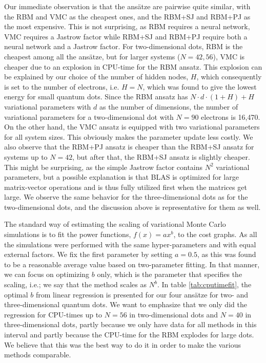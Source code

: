 Our immediate observation is that the ansätze are pairwise quite similar, with the RBM and VMC as the cheapest ones, and the RBM+SJ and RBM+PJ as the most expensive. This is not surprising, as RBM requires a neural network, VMC requires a Jastrow factor while RBM+SJ and RBM+PJ require both a neural network and a Jastrow factor. For two-dimensional dots, RBM is the cheapest among all the ansätze, but for larger systems ($N=42,56$), VMC is cheaper due to an explosion in CPU-time for the RBM ansatz. This explosion can be explained by our choice of the number of hidden nodes, $H$, which consequently is set to the number of electrons, i.e. $H=N$, which was found to give the lowest energy for small quantum dots\supercite{flugsrud_vilde_moe_solving_nodate}. Since the RBM ansatz has $N\cdot d\cdot (1+H)+H$ variational parameters with $d$ as the number of dimensions, the number of variational parameters for a two-dimensional dot with $N=90$ electrons is 16,470. On the other hand, the VMC ansatz is equipped with two variational parameters for all system sizes. This obviously makes the parameter update less costly. We also observe that the RBM+PJ ansatz is cheaper than the RBM+SJ ansatz for systems up to $N=42$, but after that, the RBM+SJ ansatz is slightly cheaper. This might be surprising, as the simple Jastrow factor contains $N^2$ variational parameters, but a possible explanation is that BLAS is optimized for large matrix-vector operations and is thus fully utilized first when the matrices get large. We observe the same behavior for the three-dimensional dots as for the two-dimensional dots, and the discussion above is representative for them as well.

The standard way of estimating the scaling of variational Monte Carlo simulations is to fit the power functions, $f(x)=ax^b$, to the cost graphs. As all the simulations were performed with the same hyper-parameters and with equal external factors. We fix the first parameter by setting $a=0.5$, as this was found to be a reasonable average value based on two-parameter fitting. In that manner, we can focus on optimizing $b$ only, which is the parameter that specifies the scaling, i.e.; we say that the method scales as $N^b$. In table \eqref{tab:cputimefit}, the optimal $b$ from linear regression is presented for our four ansätze for two- and three-dimensional quantum dots. We want to emphasize that we only did the regression for CPU-times up to $N=56$ in two-dimensional dots and $N=40$ in three-dimensional dots, partly because we only have data for all methods in this interval and partly because the CPU-time for the RBM explodes for large dots. We believe that this was the best way to do it in order to make the various methods comparable. 

